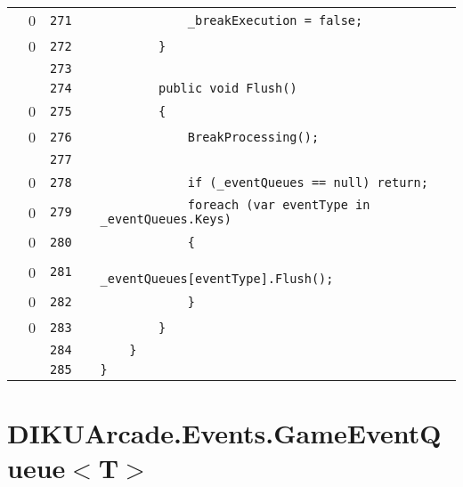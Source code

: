 \documentclass[a4paper,landscape,10pt]{article}
\begin{document}
\begin{longtable}[l]{lrrll}
\cellcolor{red} & 0 & \verb~271~ & & \verb~            _breakExecution = false;~\\
\cellcolor{red} & 0 & \verb~272~ & & \verb~        }~\\
\cellcolor{gray} &  & \verb~273~ & & \verb~~\\
\cellcolor{gray} &  & \verb~274~ & & \verb~        public void Flush()~\\
\cellcolor{red} & 0 & \verb~275~ & & \verb~        {~\\
\cellcolor{red} & 0 & \verb~276~ & & \verb~            BreakProcessing();~\\
\cellcolor{gray} &  & \verb~277~ & & \verb~~\\
\cellcolor{red} & 0 & \verb~278~ & & \verb~            if (_eventQueues == null) return;~\\
\cellcolor{red} & 0 & \verb~279~ & & \verb~            foreach (var eventType in _eventQueues.Keys)~\\
\cellcolor{red} & 0 & \verb~280~ & & \verb~            {~\\
\cellcolor{red} & 0 & \verb~281~ & & \verb~                _eventQueues[eventType].Flush();~\\
\cellcolor{red} & 0 & \verb~282~ & & \verb~            }~\\
\cellcolor{red} & 0 & \verb~283~ & & \verb~        }~\\
\cellcolor{gray} &  & \verb~284~ & & \verb~    }~\\
\cellcolor{gray} &  & \verb~285~ & & \verb~}~\\
\end{longtable}
\newpage
\section{DIKUArcade.Events.GameEventQueue$<$T$>$}
\end{document}
